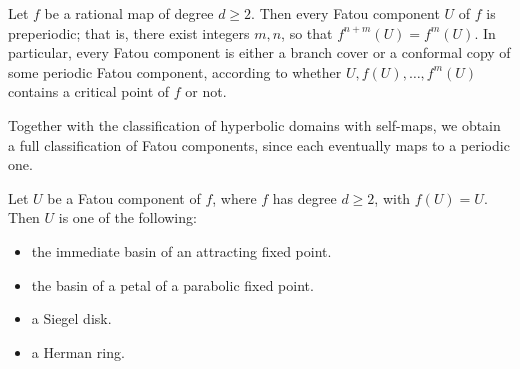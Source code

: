 \documentclass[10pt,a4paper]{article}
\begin{document}
\begin{theorem}
  Let $f$ be a rational map of degree $d \geq 2$. Then every Fatou component $U$ of $f$ is preperiodic; that is, there exist integers $m, n$, so that $f^{n+m}(U) = f^m(U)$. In particular, every Fatou component is either a branch cover or a conformal copy of some periodic Fatou component, according to whether $U, f(U), \ldots, f^m(U)$ contains a critical point of $f$ or not.
\end{theorem}
Together with the classification of hyperbolic domains with self-maps, we obtain a full classification of Fatou components, since each eventually maps to a periodic one.
\begin{theorem}
  Let $U$ be a Fatou component of $f$, where $f$ has degree $d \geq 2$, with $f(U) = U$. Then $U$ is one of the following:
  \begin{itemize}
    \item the immediate basin of an attracting fixed point.
    \item the basin of a petal of a parabolic fixed point.
    \item a Siegel disk.
    \item a Herman ring.
  \end{itemize}
\end{theorem}
\end{document}
